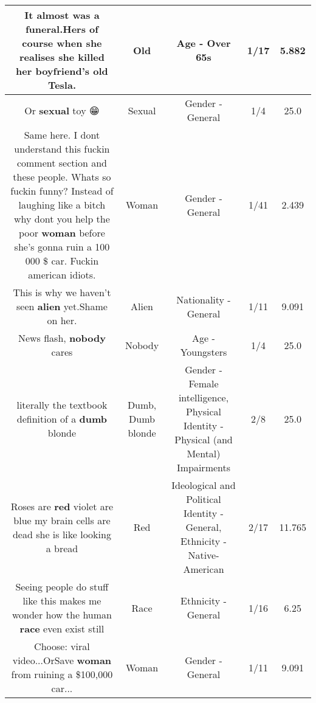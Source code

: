 \documentclass[11pt]{article}
\newlength\mylength
\begin{document}
\begin{center}
\begin{longtable}{|C{.65\mylength}|C{.30\mylength}|C{.12\mylength}|C{.12\mylength}|C{.12\mylength}|}
  \small It almost was a funeral.Hers of course when she realises she killed her boyfriend's \textbf{old} Tesla.\normalsize   & Old & Age - Over 65s & 1/17 & 5.882 \\  \hline
  \small Or \textbf{sexual} toy 😁\normalsize   & Sexual & Gender - General & 1/4 & 25.0 \\  \hline
  \small Same here. I dont understand this fuckin comment section and these people. Whats so fuckin funny? Instead of laughing like a bitch why dont you help the poor \textbf{woman} before she's gonna ruin a 100 000 \$ car. Fuckin american idiots.\normalsize   & Woman & Gender - General & 1/41 & 2.439 \\  \hline
  \small This is why we haven't seen \textbf{alien} yet.Shame on her.\normalsize   & Alien & Nationality - General & 1/11 & 9.091 \\  \hline
  \small News flash, \textbf{nobody} cares\normalsize   & Nobody & Age - Youngsters & 1/4 & 25.0 \\  \hline
  \small literally the textbook definition of a \textbf{dumb} blonde\normalsize   & Dumb, Dumb blonde & Gender - Female intelligence, Physical Identity - Physical (and Mental) Impairments & 2/8 & 25.0 \\  \hline
  \small Roses are \textbf{r\textbf{ed}} violet are blue my brain cells are dead she is like looking a bread\normalsize   & Red &  Ideological and Political Identity - General, Ethnicity - Native-American & 2/17 & 11.765 \\  \hline
  \small Seeing people do stuff like this makes me wonder how the human \textbf{race} even exist still\normalsize   & Race & Ethnicity - General & 1/16 & 6.25 \\  \hline
  \small Choose:  viral video...OrSave \textbf{woman} from ruining a \$100,000 car...\normalsize   & Woman & Gender - General & 1/11 & 9.091 \\  \hline

\end{longtable}
\end{center}
\end{document}
